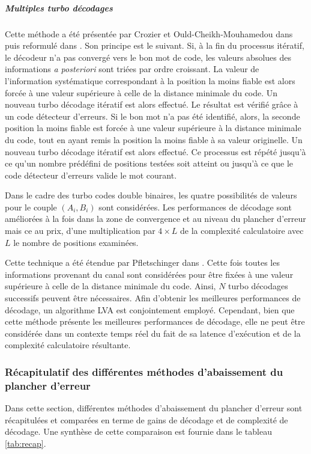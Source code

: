 \subparagraph{Multiples turbo décodages} Cette méthode a été présentée par Crozier et Ould-Cheikh-Mouhamedou dans 
\cite{cim} puis reformulé dans \cite{fsm}. Son principe est le suivant. Si, à la fin du processus itératif, le décodeur 
n'a pas convergé vers le bon mot de code, les valeurs absolues des informations \textit{a posteriori} sont triées par 
ordre croissant. La valeur de l'information systématique correspondant à la position la moins fiable est alors forcée à 
une valeur supérieure à celle de la distance minimale du code. Un nouveau turbo décodage itératif est alors effectué. Le 
résultat est vérifié grâce à un code détecteur d'erreurs. Si le bon mot n'a pas été identifié, alors, la seconde position 
la moins fiable est forcée à une valeur supérieure à la distance minimale du code, tout en ayant remis la position la moins 
fiable à sa valeur originelle. Un nouveau turbo décodage itératif est alors effectué. Ce processus est répété jusqu'à ce 
qu'un nombre prédéfini de positions testées soit atteint ou jusqu'à ce que le code détecteur d'erreurs valide le mot courant.

Dans le cadre des turbo codes double binaires, les quatre possibilités de valeurs pour le couple $(A_i,B_i)$ sont 
considérées. Les performances de décodage sont améliorées à la fois dans la zone de convergence et au niveau du plancher 
d'erreur mais ce au prix, 
d'une multiplication par $4\times L$ de la complexité calculatoire avec $L$ le nombre de positions examinées.

Cette technique a été étendue par Pfletschinger dans \cite{pflet}. Cette fois toutes les informations provenant du canal 
sont considérées pour être fixées à une valeur supérieure à celle de la distance minimale du code. Ainsi, $N$ turbo 
décodages successifs peuvent être nécessaires. Afin d'obtenir les meilleures performances de décodage, un algorithme LVA 
est conjointement employé. Cependant, bien que cette méthode présente les meilleures performances de décodage, elle ne 
peut être considérée dans un contexte temps réel du fait de sa latence d'exécution et de la complexité calculatoire 
résultante.

\subsubsection{Récapitulatif des différentes méthodes d'abaissement du plancher d'erreur}
Dans cette section, différentes méthodes d'abaissement du plancher d'erreur sont récapitulées et comparées en terme de 
gains de décodage et de complexité de décodage. Une synthèse de cette comparaison est fournie dans le tableau \ref{tab:recap}.

